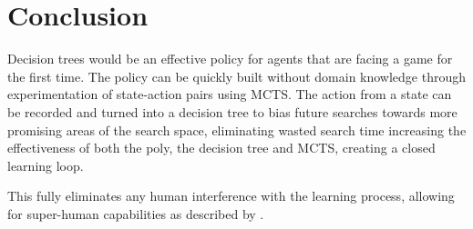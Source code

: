 \documentclass[conference]{IEEEtran}
\begin{document}
\section{Conclusion}
Decision trees would be an effective policy for agents that are facing a game for the first time. The policy can be quickly built without domain knowledge through experimentation of state-action pairs using MCTS. The action from a state can be recorded and turned into a decision tree to bias future searches towards more promising areas of the search space, eliminating wasted search time increasing the effectiveness of both the poly, the decision tree and MCTS, creating a closed learning loop.

This fully eliminates any human interference with the learning process, allowing for super-human capabilities as described by \cite{go}. 



\end{document}
